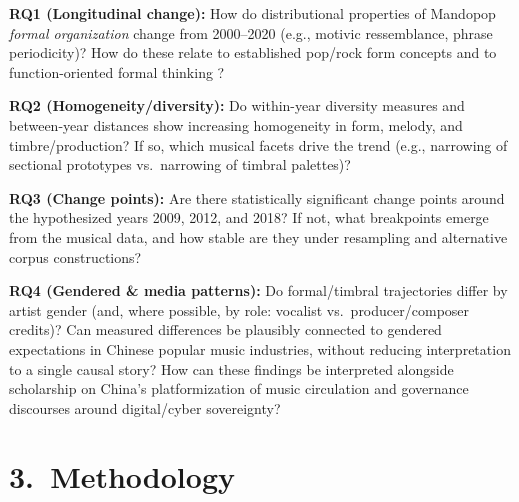 \documentclass[11pt]{article}
\begin{document}
\textbf{RQ1 (Longitudinal change):} How do distributional properties of Mandopop \emph{formal organization} change from 2000--2020 (e.g., motivic ressemblance, phrase periodicity)? How do these relate to established pop/rock form concepts \citep{covach2005form,nobile2020} and to function-oriented formal thinking \citep{caplin1998}?

\textbf{RQ2 (Homogeneity/diversity):} Do within-year diversity measures and between-year distances show increasing homogeneity in form, melody, and timbre/production? If so, which musical facets drive the trend (e.g., narrowing of sectional prototypes vs.\ narrowing of timbral palettes)?

\textbf{RQ3 (Change points):} Are there statistically significant change points around the hypothesized years 2009, 2012, and 2018? If not, what breakpoints emerge from the musical data, and how stable are they under resampling and alternative corpus constructions? 

\textbf{RQ4 (Gendered \& media patterns):} Do formal/timbral trajectories differ by artist gender (and, where possible, by role: vocalist vs.\ producer/composer credits)? Can measured differences be plausibly connected to gendered expectations in Chinese popular music industries, without reducing interpretation to a single causal story? How can these findings be interpreted alongside scholarship on China’s platformization of music circulation and governance discourses around digital/cyber sovereignty? 



\section*{3.\ Methodology}



\end{document}
